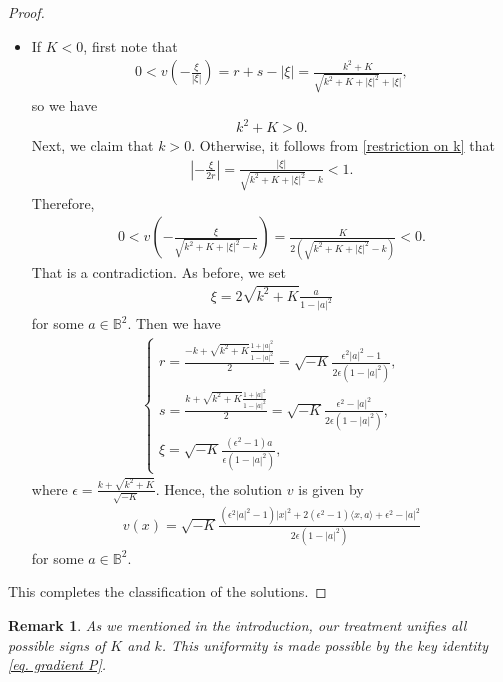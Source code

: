 \documentclass[11pt,a4paper,twoside]{amsart}
\newtheorem{remark}[theorem]{Remark}
\newtheorem{sketch proof}{Sketch of the proof}[section]
\begin{document}
\begin{proof}
\begin{itemize}
\item If $K<0$, first note that
\begin{align*}
    0<v\left(-\frac{\xi}{|\xi|}\right)
    =r+s-|\xi|
    =\frac{k^2+K}{\sqrt{k^2+K+|\xi|^2}+|\xi|},
\end{align*}
so we have 
\begin{align}\label{restriction on k}
    k^2+K>0.
\end{align}
Next, we claim that $k>0$. Otherwise, it follows from \cref{restriction on k} that
\begin{align*}
    \left|-\frac{\xi}{2r}\right|
    =\frac{|\xi|}{\sqrt{k^2+K+|\xi|^2}-k}<1.
\end{align*}
Therefore,
\begin{align*}
    0<v\left(
    -\frac{\xi}{\sqrt{k^2+K+|\xi|^2}-k}
    \right)
    =\frac{K}{2(\sqrt{k^2+K+|\xi|^2}-k)}<0.
\end{align*}
That is a contradiction. As before, we set
\begin{align*}
    \xi=2\sqrt{k^2+K}\frac{a}{1-|a|^2}
\end{align*}
for some $a\in\mathbb{B}^2$.
Then we have
\begin{align*}
    \begin{cases}
        r=\frac{-k+\sqrt{k^2+K}\frac{1+|a|^2}{1-|a|^2}}{2}
    =\sqrt{-K}\frac{\epsilon^2 |a|^2-1}{2\epsilon(1-|a|^2)},\\[2mm]
    s=\frac{k+\sqrt{k^2+K}\frac{1+|a|^2}{1-|a|^2}}{2}
    =\sqrt{-K}\frac{\epsilon^2- |a|^2}{2\epsilon(1-|a|^2)},\\[2mm]
    \xi=\sqrt{-K}\frac{(\epsilon^2-1)a}{\epsilon(1-|a|^2)},
    \end{cases}
\end{align*}
where $\epsilon
=\frac{k+\sqrt{k^2+K}}{\sqrt{-K}}$.
Hence, the solution $v$ is given by
\begin{align*}
    v(x)=\sqrt{-K}
    \frac{(\epsilon^2|a|^2-1)|x|^2
    +2(\epsilon^2-1)\langle x,a\rangle
    +\epsilon^2-|a|^2}{2\epsilon(1-|a|^2)}
\end{align*}
for some $a\in\mathbb{B}^2$. 
\end{itemize}

This completes the classification of the solutions.
\end{proof}
\begin{remark}
    As we mentioned in the introduction, our treatment unifies all possible signs of $K$ and $k$.
    This uniformity is made possible by the key identity 
    \cref{eq. gradient P}.
\end{remark}
\end{document}
